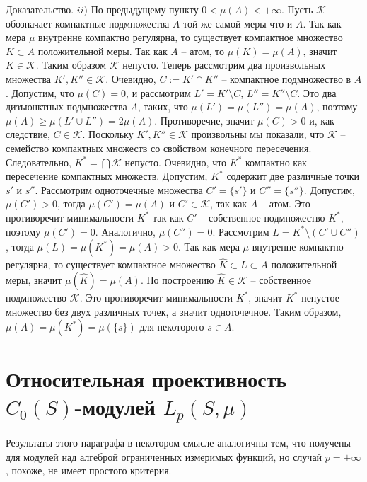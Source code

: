\documentclass[12pt]{article}
\numberwithin{equation}{subsection}
\theoremstyle{plain}
\newenvironment{proof}{Доказательство.}{}
\begin{document}
\begin{fulltext}
\begin{proof}
        $ii)$ По предыдущему пункту $0<\mu(A)<+\infty$. Пусть $\mathcal{K}$ обозначает компактные подмножества $A$ той же самой меры что и $A$. Так как мера $\mu$ внутренне компактно регулярна, то существует компактное множество $K\subset A$ положительной меры. Так как $A$ -- атом, то $\mu(K)=\mu(A)$, значит $K\in\mathcal{K}$. Таким образом $\mathcal{K}$ непусто. Теперь рассмотрим два произвольных множества $K',K''\in\mathcal{K}$. Очевидно, $C:=K'\cap K''$ -- компактное подмножество в $A$. Допустим, что $\mu(C)=0$, и рассмотрим $L'=K'\setminus C$, $L''=K''\setminus C$. Это два дизъюнктных  подмножества $A$, таких, что $\mu(L')=\mu(L'')=\mu(A)$, поэтому $\mu(A)\geq \mu(L'\cup L'')=2\mu(A)$. Противоречие, значит $\mu(C)>0$ и, как следствие, $C\in\mathcal{K}$. Поскольку $K', K''\in \mathcal{K}$ произвольны мы показали, что $\mathcal{K}$ -- семейство компактных множеств со свойством конечного пересечения. Следовательно, $K^*=\bigcap\mathcal{K}$ непусто. Очевидно, что $K^*$ компактно как пересечение компактных множеств. Допустим, $K^*$ содержит две различные точки $s'$ и $s''$. Рассмотрим одноточечные множества $C'=\{s'\}$ и $C''=\{s''\}$. Допустим, $\mu(C')>0$, тогда $\mu(C')=\mu(A)$ и $C'\in\mathcal{K}$, так как $A$ -- атом. Это противоречит минимальности $K^*$ так как $C'$ -- собственное подмножество $K^*$, поэтому $\mu(C')=0$. Аналогично, $\mu(C'')=0$. Рассмотрим $L=K^*\setminus (C'\cup C'')$, тогда $\mu(L)=\mu(K^*)=\mu(A)>0$. Так как мера $\mu$ внутренне компактно регулярна, то существует компактное множество $\hat{K}\subset L\subset A$ положительной меры, значит $\mu(\hat{K})=\mu(A)$. По построению $\hat{K}\in\mathcal{K}$ -- собственное подмножество $\mathcal{K}$. Это противоречит минимальности $K^*$, значит $K^*$ непустое множество без двух различных точек, а значит одноточечное. Таким образом, $\mu(A)=\mu(K^*)=\mu(\{s\})$ для некоторого $s\in A$.
    \end{proof}


    \section{Относительная проективность $C_0(S)$-модулей $L_p(S,\mu)$}
    \label{SectionRelativeProjectivityOfC0SModulesLpSmu}

    Результаты этого параграфа в некотором смысле аналогичны тем, что получены для модулей над алгеброй ограниченных измеримых функций, но случай $p=+\infty$, похоже, не имеет простого критерия.


\end{fulltext}
\end{document}
